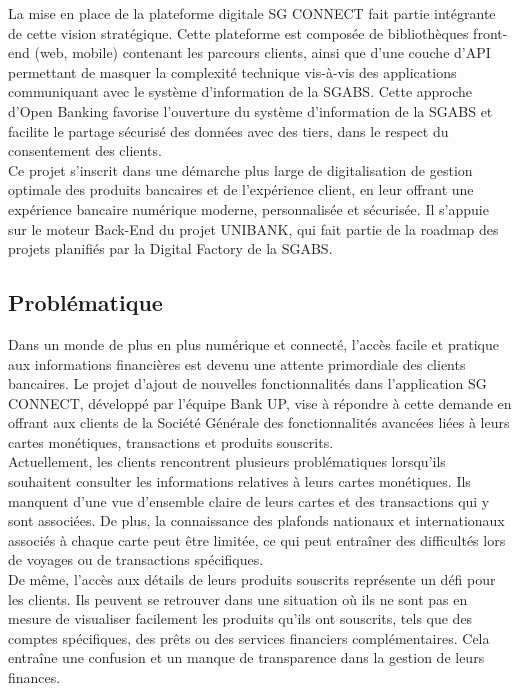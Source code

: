 La mise en place de la plateforme digitale SG CONNECT fait partie intégrante de cette vision stratégique. Cette plateforme est composée de bibliothèques front-end (web, mobile) contenant les parcours clients, ainsi que d'une couche d'API permettant de masquer la complexité technique vis-à-vis des applications communiquant avec le système d'information de la SGABS. Cette approche d'Open Banking favorise l'ouverture du système d'information de la SGABS et facilite le partage sécurisé des données avec des tiers, dans le respect du consentement des clients.\\

Ce projet s'inscrit dans une démarche plus large de digitalisation de gestion optimale des produits bancaires et de l'expérience client, en leur offrant une expérience bancaire numérique moderne, personnalisée et sécurisée. Il s'appuie sur le moteur Back-End du projet UNIBANK, qui fait partie de la roadmap des projets planifiés par la Digital Factory de la SGABS.

\subsection{Problématique}
Dans un monde de plus en plus numérique et connecté, l'accès facile et pratique aux informations financières est devenu une attente primordiale des clients bancaires. Le projet d'ajout de nouvelles fonctionnalités dans l'application SG CONNECT, développé par l'équipe Bank UP, vise à répondre à cette demande en offrant aux clients de la Société Générale des fonctionnalités avancées liées à leurs cartes monétiques, transactions et produits souscrits.\\

Actuellement, les clients rencontrent plusieurs problématiques lorsqu'ils souhaitent consulter les informations relatives à leurs cartes monétiques. Ils manquent d'une vue d'ensemble claire de leurs cartes et des transactions qui y sont associées. De plus, la connaissance des plafonds nationaux et internationaux associés à chaque carte peut être limitée, ce qui peut entraîner des difficultés lors de voyages ou de transactions spécifiques.\\

De même, l'accès aux détails de leurs produits souscrits représente un défi pour les clients. Ils peuvent se retrouver dans une situation où ils ne sont pas en mesure de visualiser facilement les produits qu'ils ont souscrits, tels que des comptes spécifiques, des prêts ou des services financiers complémentaires. Cela entraîne une confusion et un manque de transparence dans la gestion de leurs finances.\\


